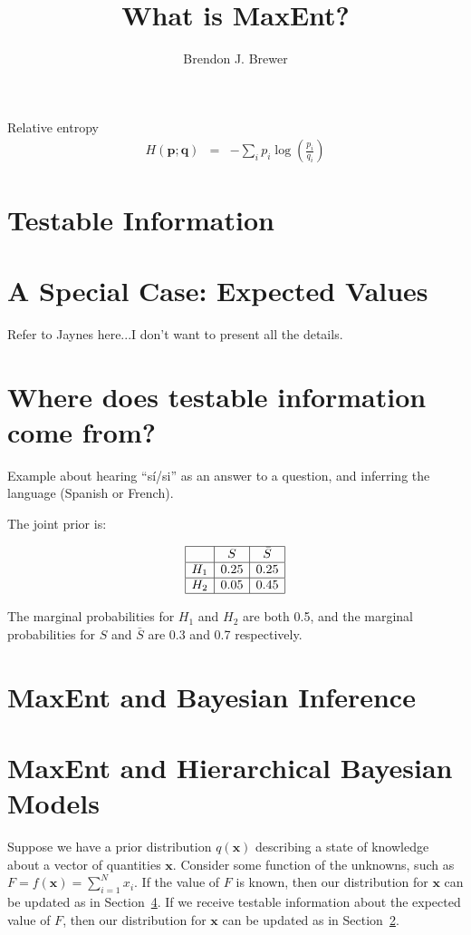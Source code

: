\documentclass[letterpaper, 11pt]{article}
\title{What is MaxEnt?}
\author{Brendon J. Brewer}
\begin{document}
\maketitle



Relative entropy
\begin{eqnarray}
H(\boldsymbol{p}; \boldsymbol{q}) &=& -\sum_i p_i \log\left(\frac{p_i}{q_i}\right) 
\end{eqnarray}

\section{Testable Information}

\section{A Special Case: Expected Values}\label{sec:expectations}
Refer to Jaynes here...I don't want to present all the details.

\section{Where does testable information come from?}

Example about hearing ``sí/si'' as an answer to a question,
and inferring the language (Spanish or French).

The joint prior is:

\begin{eqnarray}
\begin{array}{|c|c|c|}
\hline
	&	S	& \bar{S}\\
\hline
H_1 & 0.25  & 0.25\\
\hline
H_2 & 0.05 & 0.45\\
\hline
\end{array}
\end{eqnarray}

The marginal probabilities for $H_1$ and $H_2$ are both 0.5, and the
marginal probabilities for $S$ and $\bar{S}$ are 0.3 and 0.7 respectively.


\section{MaxEnt and Bayesian Inference}\label{sec:bayes}

\section{MaxEnt and Hierarchical Bayesian Models}
Suppose we have a prior distribution $q(\boldsymbol{x})$ describing a state of
knowledge about a vector of quantities $\boldsymbol{x}$. Consider some
function of the unknowns, such as $F=f(\boldsymbol{x}) = \sum_{i=1}^N x_i$.
If the value of $F$ is known, then our distribution for $\boldsymbol{x}$ can
be updated as in Section~\ref{sec:bayes}. If we receive testable information
about the expected value of $F$, then our distribution for $\boldsymbol{x}$ can
be updated as in Section~\ref{sec:expectations}.
\end{document}
